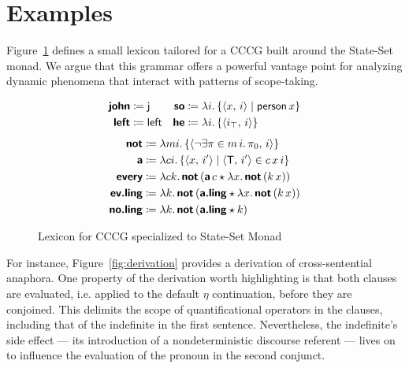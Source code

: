 \section{Examples}
  Figure~\ref{fig:lexicon} defines a small lexicon tailored for a CCCG built around the State-Set monad. We argue that this grammar offers a powerful vantage point for analyzing dynamic phenomena that interact with patterns of scope-taking.%
  \begin{figure}
    \vspace{-1em}
    \begin{align*}
      \bsf{john}    &\ceq \textsf{j}
                    &
      \bsf{so}      &\ceq \lambda i.\,\{\ab{x,\,i} \mid \textsf{person}\,x\}
      \\
      \bsf{left}    &\ceq \textsf{left}%
                    &
      \bsf{he}      &\ceq \lambda i.\,\{\ab{i_\top,\,i}\}%
    \end{align*}
    \vspace{-3em}
    \begin{align*}
      \bsf{not}     &\ceq \lambda mi.\left\{\ab{\neg\exists \pi \in m\,i.\,\pi_0,\,i}\right\}%
      \\
      \bsf{a}       &\ceq \lambda ci.\,\{\ab{x,\,i'} \mid \ab{\textsf{T},\,i'} \in c\,x\,i\}%
      \\
      \bsf{every}   &\ceq \lambda ck.\,\bsf{not}\,(\bsf{a}\,c \star \lambda x.\,\bsf{not}\,(k\,x))%
      \\
      \bsf{ev.ling} &\ceq \lambda k.\,\bsf{not}\,(\bsf{a.ling} \star \lambda x.\,\bsf{not}\,(k\,x))%
      \\
      \bsf{no.ling} &\ceq \lambda k.\,\bsf{not}\,(\bsf{a.ling} \star k)%
    \end{align*}
    \vspace{-2em}
		\caption{Lexicon for CCCG specialized to State-Set Monad}%
    \label{fig:lexicon}%
  \end{figure}%
  
  For instance, Figure~\ref{fig:derivation} provides a derivation of cross-sentential anaphora. One property of the derivation worth highlighting is that both clauses are evaluated, i.e. applied to the default $\eta$ continuation, before they are conjoined. This delimits the scope of quantificational operators in the clauses, including that of the indefinite in the first sentence. Nevertheless, the indefinite's side effect --- its introduction of a nondeterministic discourse referent --- lives on to influence the evaluation of the pronoun in the second conjunct.

